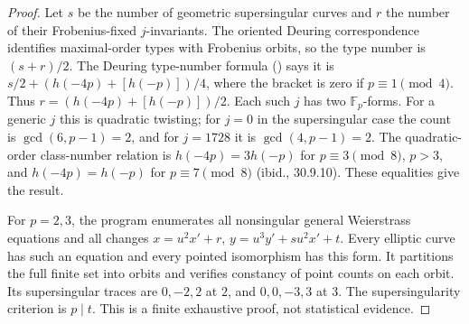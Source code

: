 \begin{proof}
Let $s$ be the number of geometric supersingular curves and $r$ the
number of their Frobenius-fixed $j$-invariants. The oriented Deuring
correspondence identifies maximal-order types with Frobenius orbits,
so the type number is $(s+r)/2$. The Deuring type-number formula
(\citealp[Proposition 30.9.2]{Voight2021}) says it is
$s/2+(h(-4p)+[h(-p)])/4$, where the bracket is zero if
$p\equiv1\pmod4$. Thus $r=(h(-4p)+[h(-p)])/2$.
Each such $j$ has two $\mathbb F_p$-forms. For a generic $j$ this is
quadratic twisting; for $j=0$ in the supersingular case the count is
$\gcd(6,p-1)=2$, and for $j=1728$ it is $\gcd(4,p-1)=2$.
The quadratic-order class-number relation is
$h(-4p)=3h(-p)$ for $p\equiv3\pmod8$, $p>3$, and
$h(-4p)=h(-p)$ for $p\equiv7\pmod8$ (ibid., 30.9.10).
These equalities give the result.

For $p=2,3$, the program enumerates all nonsingular general
Weierstrass equations and all changes
$x=u^2x'+r$, $y=u^3y'+su^2x'+t$. Every elliptic curve has such an
equation and every pointed isomorphism has this form. It partitions
the full finite set into orbits and verifies constancy of point counts
on each orbit. Its supersingular traces are $0,-2,2$ at $2$, and
$0,0,-3,3$ at $3$. The supersingularity criterion is $p\mid t$.
This is a finite exhaustive proof, not statistical evidence.
\end{proof}


